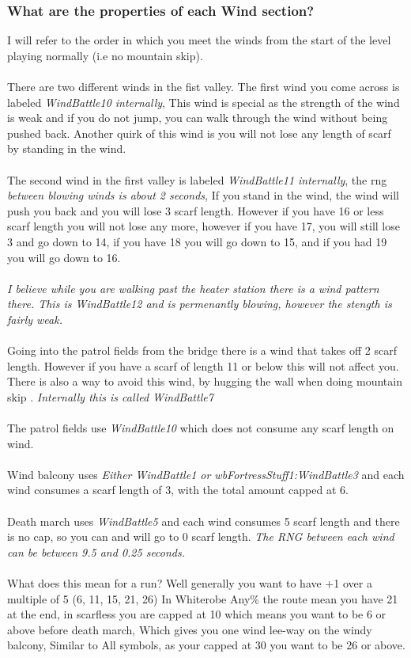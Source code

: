 \subsubsection*{What are the properties of each Wind section?}
I will refer to the order in which you meet the winds from the start of the level playing normally (i.e no mountain skip).\\
\\
There are two different winds in the fist valley. The first wind you come across is labeled \textit{WindBattle10 internally}, This wind is special as the strength of the wind is 
weak and if you do not jump, you can walk through the wind without being pushed back. Another quirk of this wind is you will not lose any length of scarf by standing in the wind.\\
\\ 
The second wind in the first valley is labeled \textit{WindBattle11 internally}, the rng \textit{between blowing winds is about 2 seconds}, If you stand in the wind, the wind 
will push you back and you will lose 3 scarf length. However if you have 16 or less scarf length you will not lose any more, however if you have 17, you will still lose 3 and go
down to 14, if you have 18 you will go down to 15, and if you had 19 you will go down to 16.\\
\\
\textit{I believe while you are walking past the heater station there is a wind pattern there. This is WindBattle12 and is permenantly blowing, however the stength is fairly
weak.}\\
\\
Going into the patrol fields from the bridge there is a wind that takes off 2 scarf length. However if you have a scarf of length 11 or below this will not affect you. 
There is also a way to avoid this wind, by hugging the wall when doing mountain skip \autocite{gadullusPFSC}. \textit{Internally this is called WindBattle7}\\
\\
The patrol fields use \textit{WindBattle10} which does not consume any scarf length on wind.\\
\\
Wind balcony uses \textit{Either WindBattle1 or wbFortressStuff1:WindBattle3} and each wind consumes a scarf length of 3, with the total amount capped at 6.\\
\\
Death march uses \textit{WindBattle5 } and each wind consumes 5 scarf length and there is no cap, so you can and will go to 0 scarf length. 
\textit{The RNG between each wind can be between 9.5 and 0.25 seconds.}\\
\\
What does this mean for a run? Well generally you want to have +1 over a multiple of 5 (6, 11, 15, 21, 26) In Whiterobe Any\% the route mean you have 21 at the end, in scarfless 
you are capped at 10 which means you want to be 6 or above before death march, Which gives you one wind lee-way on the windy balcony, Similar to All symbols, as your capped at 30
you want to be 26 or above. 
